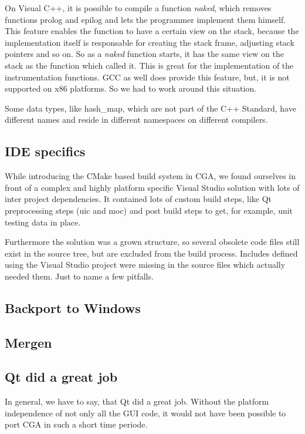 On Visual C++, it is possible to compile a function \emph{naked}, which removes functions prolog and epilog and lets the programmer implement them himself. This feature enables the function to have a certain view on the stack, because the implementation itself is responsable for creating the stack frame, adjusting stack pointers and so on. So as a \emph{naked} function starts, it has the same view on the stack as the function which called it. This is great for the implementation of the instrumentation functions. GCC as well does provide this feature, but, it is not supported on x86 platforms. So we had to work around this situation.

Some data types, like hash\_map, which are not part of the C++ Standard, have different names and reside in different namespaces on different compilers.

\subsection{IDE specifics} While introducing the CMake based build system in CGA, we found ourselves in front of a complex and highly platform specific Visual Studio solution with lots of inter project dependencies. It contained lots of custom build steps, like Qt preprocessing steps (uic and moc) and post build steps to get, for example, unit testing data in place.

Furthermore the solution was a grown structure, so several obsolete code files still exist in the source tree, but are excluded from the build process. Includes defined using the Visual Studio project were missing in the source files which actually needed them. Just to name a few pitfalls.

\subsection{Backport to Windows}

\subsection{Mergen}

\subsection{Qt did a great job} In general, we have to say, that Qt did a great job. Without the platform independence of not only all the GUI code, it would not have been possible to port CGA in such a short time periode. 
